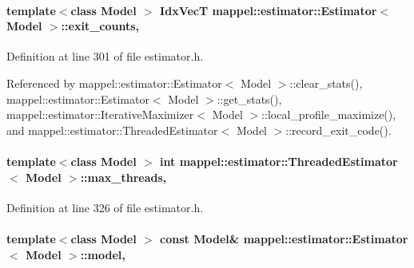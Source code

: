 \paragraph[{\texorpdfstring{exit\+\_\+counts}{exit_counts}}]{\setlength{\rightskip}{0pt plus 5cm}template$<$class Model $>$ {\bf Idx\+VecT} {\bf mappel\+::estimator\+::\+Estimator}$<$ Model $>$\+::exit\+\_\+counts\hspace{0.3cm}{\ttfamily [protected]}, {\ttfamily [inherited]}}\hypertarget{classmappel_1_1estimator_1_1Estimator_aa946d9789a1299d684f83a822a10caa7}{}\label{classmappel_1_1estimator_1_1Estimator_aa946d9789a1299d684f83a822a10caa7}


Definition at line 301 of file estimator.\+h.



Referenced by mappel\+::estimator\+::\+Estimator$<$ Model $>$\+::clear\+\_\+stats(), mappel\+::estimator\+::\+Estimator$<$ Model $>$\+::get\+\_\+stats(), mappel\+::estimator\+::\+Iterative\+Maximizer$<$ Model $>$\+::local\+\_\+profile\+\_\+maximize(), and mappel\+::estimator\+::\+Threaded\+Estimator$<$ Model $>$\+::record\+\_\+exit\+\_\+code().

\paragraph[{\texorpdfstring{max\+\_\+threads}{max_threads}}]{\setlength{\rightskip}{0pt plus 5cm}template$<$class Model $>$ int {\bf mappel\+::estimator\+::\+Threaded\+Estimator}$<$ Model $>$\+::max\+\_\+threads\hspace{0.3cm}{\ttfamily [protected]}, {\ttfamily [inherited]}}\hypertarget{classmappel_1_1estimator_1_1ThreadedEstimator_ab4c55ecff71dff47c0584ce20fe7f077}{}\label{classmappel_1_1estimator_1_1ThreadedEstimator_ab4c55ecff71dff47c0584ce20fe7f077}


Definition at line 326 of file estimator.\+h.

\paragraph[{\texorpdfstring{model}{model}}]{\setlength{\rightskip}{0pt plus 5cm}template$<$class Model $>$ const Model\& {\bf mappel\+::estimator\+::\+Estimator}$<$ Model $>$\+::model\hspace{0.3cm}{\ttfamily [protected]}, {\ttfamily [inherited]}}\hypertarget{classmappel_1_1estimator_1_1Estimator_a2f157410771fb79a20d4d54e505750d0}{}\label{classmappel_1_1estimator_1_1Estimator_a2f157410771fb79a20d4d54e505750d0}


